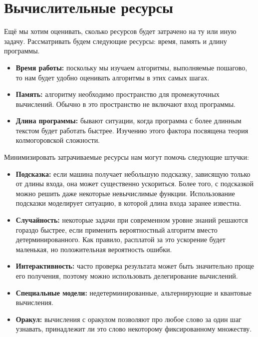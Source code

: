 \documentclass[11pt]{article}
\begin{document}
\section{Вычислительные ресурсы}

Ещё мы хотим оценивать, сколько ресурсов будет затрачено на ту или иную задачу. Рассматривать будем следующие ресурсы: время, память и длину программы.

\begin{itemize}
    \item \textbf{Время работы:} поскольку мы изучаем алгоритмы, выполняемые пошагово, то нам будет удобно оценивать алгоритмы в этих самых шагах.
    
    \item \textbf{Память:} алгоритму необходимо пространство для промежуточных вычислений. Обычно в это пространство не включают вход программы.
    
    \item \textbf{Длина программы:} бывают ситуации, когда программа с более длинным текстом будет работать быстрее. Изучению этого фактора 
    посвящена теория колмогоровской сложности.
\end{itemize}

Минимизировать затрачиваемые ресурсы нам могут помочь следующие штучки:

\begin{itemize}
    \item \textbf{Подсказка:} если машина получает небольшую подсказку, зависящую только от длины входа, она может существенно ускориться. 
    Более того, с подсказкой можно решить даже некоторые невычислимые функции. Использование подсказки моделирует ситуацию, в которой длина входа
    заранее известна.

    \item \textbf{Случайность:} некоторые задачи при современном уровне знаний решаются гораздо быстрее, если применить вероятностный
    алгоритм вместо детерминированного. Как правило, расплатой за это ускорение будет маленькая, но положительная вероятность ошибки.

    \item \textbf{Интерактивность:} часто проверка результата может быть значительно проще его получения, поэтому
    можно использовать делегирование вычислений.

    \item \textbf{Специальные модели:} недетерминированные, альтернирующие и квантовые вычисления.
    
    \item \textbf{Оракул:} вычисления с оракулом позволяют про любое слово за один шаг узнавать, принадлежит ли это слово некоторому 
    фиксированному множеству.
\end{itemize}
\end{document}
